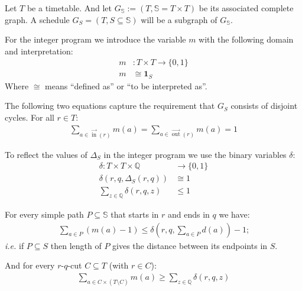 \documentclass[a4paper]{amsart}
\theoremstyle{definition}
\theoremstyle{remark}
\def\ie{\emph{i.e.}}
\DeclareMathOperator{\In}{in}
\DeclareMathOperator{\Out}{out}
\newcommand{\ina}{\ensuremath{\vec{\In}}}
\newcommand{\outa}{\ensuremath{\vec{\Out}}}
\newcommand{\rationals}{\ensuremath{\mathbb{Q}}}
\begin{document}
Let \(T\) be a timetable.  And let \(G_\mathbb{S} := (T, \mathbb{S} =
T \times T) \) be its associated complete graph.  A schedule \(G_S =
(T, S \subseteq \mathbb{S})\) will be a subgraph of \(G_\mathbb{S}\).


For the integer program we introduce the variable \(m\) with the
following domain and interpretation:
\begin{align}
  m & \colon T \times T \to \{0,1\} \\
  m & \cong \mathbf{1}_{S}
\end{align}
Where \(\cong\) means ``defined as'' or ``to be interpreted as''.

The following two equations capture the requirement that \(G_S\)
consists of disjoint cycles.  For all \(r \in T\):
\begin{align}
  \label{matchBedingung}
  \sum_{a \in \ina(r)}  m(a) = \sum_{a \in \outa(r)} m(a) = 1
\end{align}

To reflect the values of \(\Delta_S\) in the integer program we use the binary variables \(\delta\):
\begin{align}
  \delta \colon T \times T \times \rationals & \to \{0,1\} \\
  \delta\left(r, q, \Delta_S\left(r,q\right)\right) &\cong 1 \\
  \label{onlyOne}
  \sum_{z \in \rationals} \delta(r, q, z) &\leq 1
\end{align}

For every simple path \(P \subseteq \mathbb{S}\) that starts in \(r\) and ends in \(q\) we have:
\begin{align}
\label{zwingHoch}
\sum_{a \in P} (m(a) - 1) \leq \delta \left(r,q, \sum_{a \in P} d \left(a\right)\right) - 1 \textrm{;}
\end{align}
\ie{} if \(P \subseteq S\) then length of \(P\) gives
the distance between its endpoints in \(S\).

And for every \(r\)-\(q\)-cut \(C \subseteq T\) (with \(r \in C\)):
\begin{align}
\label{zwingRunter}
  \sum_{a \in C \times (T \setminus C)} m(a) \geq \sum_{z \in \rationals} \delta (r,q, z)
\end{align}



\end{document}

